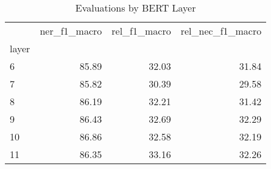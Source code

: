 \begin{table}
\centering
\caption{Evaluations by BERT Layer}
\label{tab:bertDocRed-layers}
\begin{tabular}{lrrr}
\toprule
{} &  ner\_f1\_macro &  rel\_f1\_macro &  rel\_nec\_f1\_macro \\
layer &               &               &                   \\
\midrule
6     &         85.89 &         32.03 &             31.84 \\
7     &         85.82 &         30.39 &             29.58 \\
8     &         86.19 &         32.21 &             31.42 \\
9     &         86.43 &         32.69 &             32.29 \\
10    &         86.86 &         32.58 &             32.19 \\
11    &         86.35 &         33.16 &             32.26 \\
\bottomrule
\end{tabular}
\end{table}
